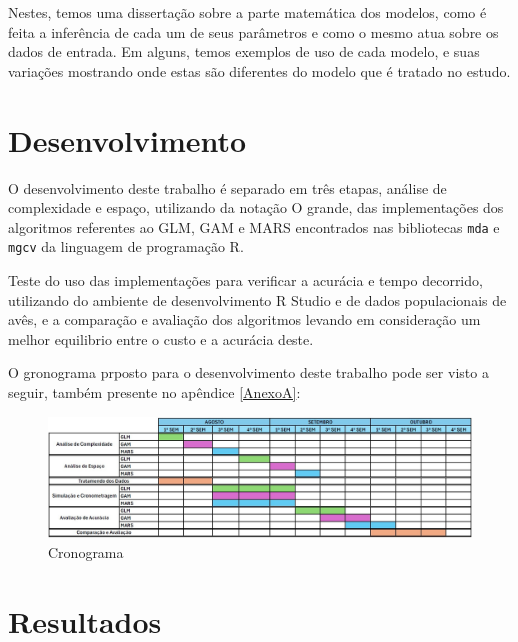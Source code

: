 \documentclass[
	12pt,				%
	openright,			%
	oneside,			%
	a4paper,			%
	english,			%
	brazil				%
	]{abntex2}
\begin{document}
Nestes, temos uma dissertação sobre a parte matemática dos modelos, como é feita a inferência de cada um de seus parâmetros e 
como o mesmo atua sobre os dados de entrada. Em alguns, temos exemplos de uso de cada modelo, e suas variações mostrando onde estas 
são diferentes do modelo que é tratado no estudo.


\chapter{Desenvolvimento}

O desenvolvimento deste trabalho é separado em três etapas, análise de complexidade e espaço, utilizando da notação O grande, 
das implementações dos algoritmos referentes ao GLM, GAM e MARS encontrados nas bibliotecas \lstinline|mda| e \lstinline|mgcv| da linguagem de programação R.

Teste do uso das implementações para verificar a acurácia e tempo decorrido, utilizando do ambiente de desenvolvimento R Studio e de dados populacionais de avês, 
e a comparação e avaliação dos algoritmos levando em consideração um melhor equilibrio entre o custo e a acurácia deste.

O gronograma prposto para o desenvolvimento deste trabalho pode ser visto a seguir, também presente no apêndice \ref{AnexoA}:

\begin{figure}[H]
    \centering
    \caption{\label{Cronograma}Cronograma}
    \includegraphics[width=1\textwidth]{../Imgs/Cronograma.jpg}
\end{figure}

 \chapter{Resultados}
 
\end{document}
